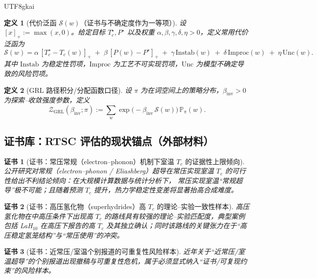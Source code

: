 \documentclass[12pt]{article}
\newtheorem{definition}{定义}[section]
\newtheorem{certificate}{证书}[section]
\begin{document}
\begin{CJK*}{UTF8}{gkai}
\begin{definition}[代价泛函 $\mathcal{S}(w)$（证书与不确定度作为一等项）]
\label{def:cost-functional}
设 $[x]_+:=\max(x,0)$。给定目标 $T_c^\star,P^\star$ 以及权重 $\alpha,\beta,\gamma,\delta,\eta>0$，定义常用代价泛函为
\[
\mathcal{S}(w)=
\alpha\,[T_c^\star - T_c(w)]_+
\;+\;
\beta\,[P(w)-P^\star]_+
\;+\;
\gamma\,\mathrm{Instab}(w)
\;+\;
\delta\,\mathrm{Improc}(w)
\;+\;
\eta\,\mathrm{Unc}(w).
\]
其中 $\mathrm{Instab}$ 为稳定性罚项，$\mathrm{Improc}$ 为工艺不可实现罚项，$\mathrm{Unc}$ 为模型不确定导致的风险罚项。
\end{definition}

\begin{definition}[GRL 路径积分/分配函数口径]
\label{def:grl-partition}
设 $\pi$ 为在词空间上的策略分布，$\beta_{\mathrm{inv}}>0$ 为探索--收敛强度参数，定义
\[
\mathcal{Z}_{\mathrm{GRL}}(\beta_{\mathrm{inv}};\pi)
:=
\sum_{w}
\exp\!\bigl(-\beta_{\mathrm{inv}}\,\mathcal{S}(w)\bigr)\,\mathbb{P}_{\pi}(w).
\]
\end{definition}

\subsection{证书库：RTSC 评估的现状锚点（外部材料）}

\begin{certificate}[证书：常压常规（electron--phonon）机制下室温 $T_c$ 的证据性上限倾向]
\label{cert:natcomm-2025-max-tc}
公开研究对常规（electron--phonon / Eliashberg）超导在常压实现室温 $T_c$ 的可行性给出不利结论倾向：在大规模计算数据与统计分析下，
常压实现室温“常规超导”极不可能；且随着预测 $T_c$ 提升，热力学稳定性变差将显著抬高合成难度。\cite{NatComm2025MaxTcConvAmbient}
\end{certificate}

\begin{certificate}[证书：高压氢化物（superhydrides）高 $T_c$ 的理论--实验一致性样本]
\label{cert:nsr-superhydrides-review}
高压氢化物在中高压条件下出现高 $T_c$ 的路线具有较强的理论--实验匹配度，典型案例包括 LaH$_{10}$ 在高压下报告的高 $T_c$ 及其独立确认；同时该路线的关键张力在于“高压稳定氢笼结构”与“常压使用”的冲突。
  \cite{NSR2024Superhydrides}
\end{certificate}

\begin{certificate}[证书：近常压/室温个别报道的可重复性风险样本]
\label{cert:pubmed-retraction}
近年关于“近常压/室温超导”的个别报道出现撤稿与可重复性危机，属于必须显式纳入“证书/可复现约束”的风险样本。\cite{PubMedRetractionLutetiumHydride}
\end{certificate}


\end{CJK*}
\end{document}
